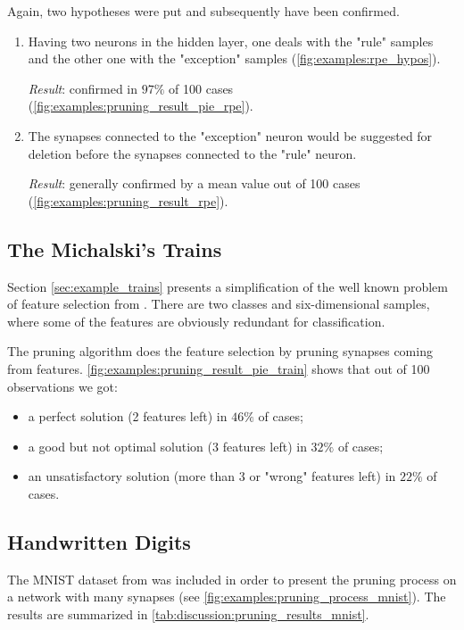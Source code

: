 Again, two hypotheses were put and subsequently have been confirmed.

\begin{enumerate}
\item Having two neurons in the hidden layer, one deals with the "rule" samples and the other one with the "exception" samples (\cref{fig:examples:rpe_hypos}).

\textit{Result}: confirmed in $ 97\% $ of 100 cases (\cref{fig:examples:pruning_result_pie_rpe}).

\item The synapses connected to the "exception" neuron would be suggested for deletion before the synapses connected to the "rule" neuron.

\textit{Result}: generally confirmed by a mean value out of 100 cases (\cref{fig:examples:pruning_result_rpe}).
\end{enumerate}

\subsection*{The Michalski's Trains}
Section \ref{sec:example_trains} presents a simplification of the well known problem of feature selection from \citep{michalski:trains}. There are two classes and six-dimensional samples, where some of the features are obviously redundant for classification.

The pruning algorithm does the feature selection by pruning synapses coming from features. \cref{fig:examples:pruning_result_pie_train} shows that out of 100 observations we got:
\begin{itemize}
\item a perfect solution (2 features left) in $ 46\% $ of cases;
\item a good but not optimal solution (3 features left) in $ 32\% $ of cases;
\item an unsatisfactory solution (more than 3 or "wrong" features left) in $ 22\% $ of cases.
\end{itemize}

\subsection*{Handwritten Digits}
The MNIST dataset from \citep{lecun:mnist} was included in order to present the pruning process on a network with many synapses (see \cref{fig:examples:pruning_process_mnist}). The results are summarized in \cref{tab:discussion:pruning_results_mnist}.

